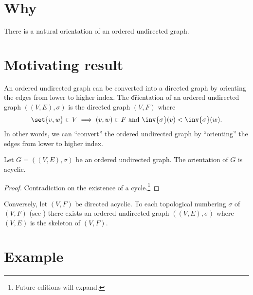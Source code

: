 
\section*{Why}

There is a natural orientation of an ordered undirected graph.

\section*{Motivating result}

An ordered undirected graph can be converted into a directed graph by orienting the edges from lower to higher index.
The \t{orientation} of an ordered undirected graph $((V, E),\sigma )$ is the directed graph $(V, F)$ where
\[
\set{v, w} \in V \implies (v, w) \in F \text{ and } \inv{\sigma }(v) < \inv{\sigma }(w).
\]
In other words, we can ``convert'' the ordered undirected graph by ``orienting'' the edges from lower to higher index.

\begin{proposition}
Let $G = ((V, E), \sigma )$ be an ordered undirected graph.
The orientation of $G$ is acyclic.
\begin{proof}Contradiction on the existence of a cycle.\footnote{Future editions will expand.}\end{proof}
\end{proposition}

Conversely, let $(V, F)$ be directed acyclic.
To each topological numbering $\sigma $ of $(V, F)$ (see ) there exists an ordered undirected graph $((V, E), \sigma )$ where $(V, E)$ is the skeleton of $(V, F)$.

\section*{Example}

